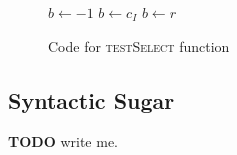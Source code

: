 \documentclass{article}
\begin{document}
\begin{figure}
\caption[testSelect]{Code for \textsc{testSelect} function} \label{test-select}
\begin{algorithmic}
	\State $b \gets -1$
	 $b \gets c_I$ \EndIf
		 $b \gets r$ \EndIf
	\EndFor
	\State {}
\EndFunction
\end{algorithmic}
\end{figure}

\subsection{Syntactic Sugar} \label{syntax-sec}

\textbf{TODO} write me.



\end{document}
